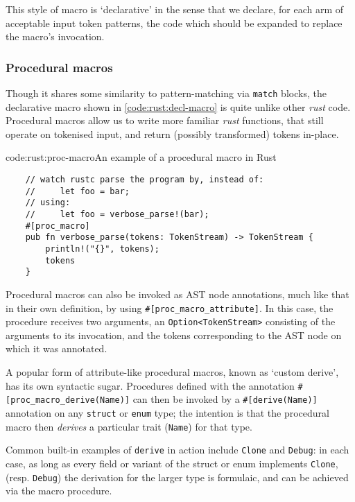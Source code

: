 This style of macro is `declarative' in the sense that we declare, for each arm of acceptable input token patterns, the code which should be expanded to replace the macro's invocation.

\subsubsection{Procedural macros} \label{bg:rust:proc-macros}

Though it shares some similarity to pattern-matching via \texttt{match} blocks, the declarative macro shown in \cref{code:rust:decl-macro} is quite unlike other \emph{rust} code. Procedural macros allow us to write more familiar \emph{rust} functions, that still operate on tokenised input, and return (possibly transformed) tokens in-place.

\begin{codelisting}{code:rust:proc-macro}{An example of a procedural macro in Rust}
\begin{spacing}{\codespacing}
\begin{verbatim}
	// watch rustc parse the program by, instead of:
	//     let foo = bar;
	// using:
	//     let foo = verbose_parse!(bar);
	#[proc_macro]
	pub fn verbose_parse(tokens: TokenStream) -> TokenStream {
	    println!("{}", tokens);
	    tokens
	}
\end{verbatim}
\end{spacing}
\end{codelisting}

Procedural macros can also be invoked as AST node annotations, much like that in their own definition, by using \texttt{#[proc_macro_attribute]}. In this case, the procedure receives two arguments, an \texttt{Option<TokenStream>} consisting of the arguments to its invocation, and the tokens corresponding to the AST node on which it was annotated. \cite{rust_rfc1566}

A popular form of attribute-like procedural macros, known as `custom derive', has its own syntactic sugar. Procedures defined with the annotation \texttt{#[proc_macro_derive(Name)]} can then be invoked by a \texttt{#[derive(Name)]} annotation on any \texttt{struct} or \texttt{enum} type; the intention is that the procedural macro then \emph{derives} a particular trait (\texttt{Name}) for that type.

Common built-in examples of \texttt{derive} in action include \texttt{Clone} and \texttt{Debug}: in each case, as long as every field or variant of the struct or enum implements \texttt{Clone}, (resp. \texttt{Debug}) the derivation for the larger type is formulaic, and can be achieved via the macro procedure.

